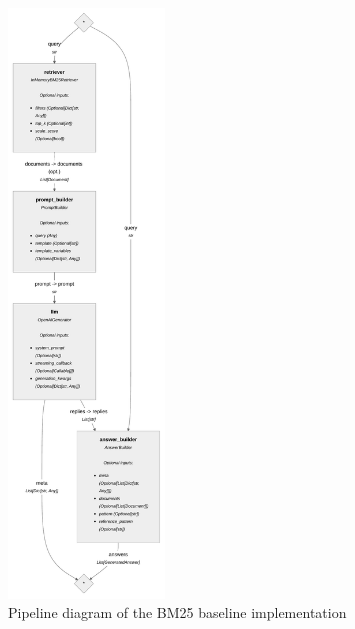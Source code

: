 \newpage

\begin{figure}[h]
    \centering
    \includegraphics[width=0.37\textwidth]{images/baseline_bm25.pdf}
    \caption{Pipeline diagram of the BM25 baseline implementation}
    \label{fig:pipeline_bm25}
\end{figure}


\newpage

